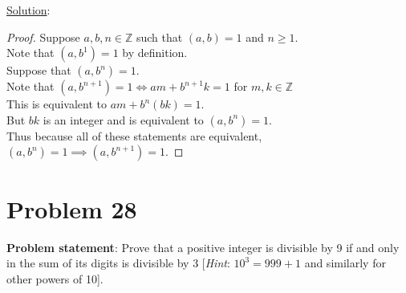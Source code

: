 \documentclass{article} %
\begin{document}
\underline{Solution}: 
\begin{addmargin}[1em]{0em}
\begin{proof}
Suppose $a,b,n \in \mathbb{Z}$ such that $(a,b) = 1$ and $n \geq 1$.
\\ 
Note that $(a, b^1) = 1$ by definition.
\\ 
Suppose that $(a, b^n) = 1$.
\\ 
Note that $(a, b^{n+1}) = 1 \Leftrightarrow am + b^{n+1}k = 1$ for $m, k \in \mathbb{Z}$
\\This is equivalent to $am + b^n(bk) = 1$.
\\But $bk$ is an integer and is equivalent to $(a,b^n) = 1$.
\\Thus because all of these statements are equivalent, $(a,b^n) = 1 \implies (a,b^{n+1}) = 1$.
\end{proof}
\end{addmargin}

\newpage

\section*{Problem 28}


\textbf{Problem statement}: Prove that a positive integer is divisible by 9 if and only in the sum of its digits is divisible by 3 [\textit{Hint}: $10^3 = 999 + 1$ and similarly for other powers of 10].
\\
\end{document}
